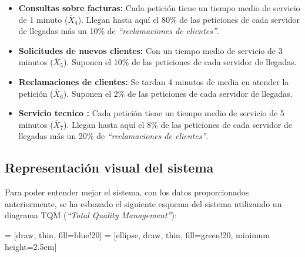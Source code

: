 \begin{itemize}
  \item \textbf{Consultas sobre facturas:} Cada petición tiene un tiempo medio de servicio de 1 minuto ($\overline{X}_{4}$). Llegan hasta aquí el 80\% de las peticiones de cada servidor de llegadas más un 10\% de \emph{``reclamaciones de clientes''}.
  \item \textbf{Solicitudes de nuevos clientes:} Con un tiempo medio de servicio de 3 minutos ($\overline{X}_{5}$). Suponen el 10\% de las peticiones de cada servidor de llegadas.
  \item \textbf{Reclamaciones de clientes:} Se tardan 4 minutos de media en atender la petición ($\overline{X}_{6}$). Suponen el 2\% de las peticiones de cada servidor de llegadas.
  \item \textbf{Servicio tecnico :} Cada petición tiene un tiempo medio de servicio de 5 minutos ($\overline{X}_{7}$). Llegan hasta aquí el 8\% de las peticiones de cada servidor de llegadas más un 20\% de \emph{``reclamaciones de clientes''}.
\end{itemize}

\subsection{Representación visual del sistema}
Para poder entender mejor el sistema, con los datos proporcionados anteriormente, se ha esbozado el siguiente esquema del sistema utilizando un diagrama TQM (\emph{``Total Quality Management''}):

 = [draw, thin, fill=blue!20]
 = [ellipse, draw, thin, fill=green!20, minimum height=2.5em]


